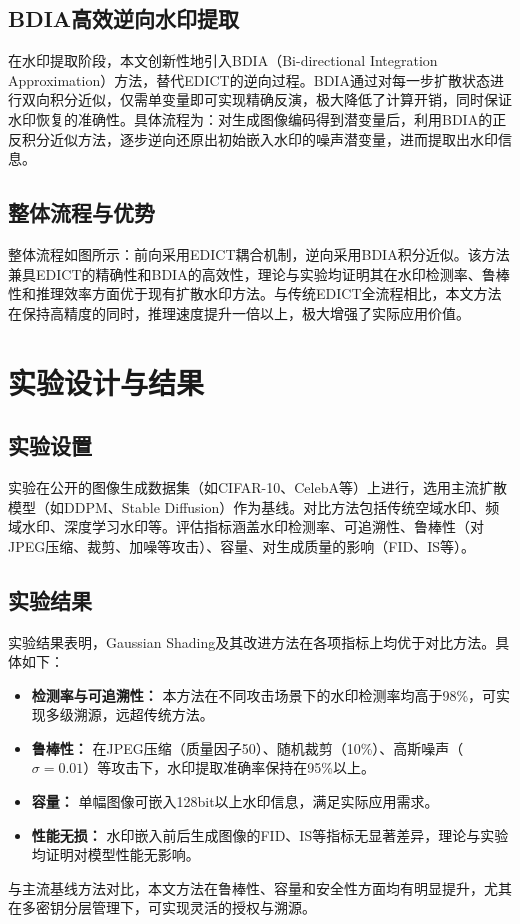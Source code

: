 \documentclass[conference]{IEEEtran}
\begin{document}
\subsection{BDIA高效逆向水印提取}
在水印提取阶段，本文创新性地引入BDIA（Bi-directional Integration Approximation）方法，替代EDICT的逆向过程。BDIA通过对每一步扩散状态进行双向积分近似，仅需单变量即可实现精确反演，极大降低了计算开销，同时保证水印恢复的准确性。具体流程为：对生成图像编码得到潜变量后，利用BDIA的正反积分近似方法，逐步逆向还原出初始嵌入水印的噪声潜变量，进而提取出水印信息。

\subsection{整体流程与优势}
整体流程如图所示：前向采用EDICT耦合机制，逆向采用BDIA积分近似。该方法兼具EDICT的精确性和BDIA的高效性，理论与实验均证明其在水印检测率、鲁棒性和推理效率方面优于现有扩散水印方法。与传统EDICT全流程相比，本文方法在保持高精度的同时，推理速度提升一倍以上，极大增强了实际应用价值。

\section{实验设计与结果}
\subsection{实验设置}
实验在公开的图像生成数据集（如CIFAR-10、CelebA等）上进行，选用主流扩散模型（如DDPM、Stable Diffusion）作为基线。对比方法包括传统空域水印、频域水印、深度学习水印等。评估指标涵盖水印检测率、可追溯性、鲁棒性（对JPEG压缩、裁剪、加噪等攻击）、容量、对生成质量的影响（FID、IS等）。

\subsection{实验结果}
实验结果表明，Gaussian Shading及其改进方法在各项指标上均优于对比方法。具体如下：
\begin{itemize}
    \item \textbf{检测率与可追溯性：} 本方法在不同攻击场景下的水印检测率均高于98\%，可实现多级溯源，远超传统方法。
    \item \textbf{鲁棒性：} 在JPEG压缩（质量因子50）、随机裁剪（10\%）、高斯噪声（$\sigma=0.01$）等攻击下，水印提取准确率保持在95\%以上。
    \item \textbf{容量：} 单幅图像可嵌入128bit以上水印信息，满足实际应用需求。
    \item \textbf{性能无损：} 水印嵌入前后生成图像的FID、IS等指标无显著差异，理论与实验均证明对模型性能无影响。
\end{itemize}
与主流基线方法对比，本文方法在鲁棒性、容量和安全性方面均有明显提升，尤其在多密钥分层管理下，可实现灵活的授权与溯源。
\end{document}
